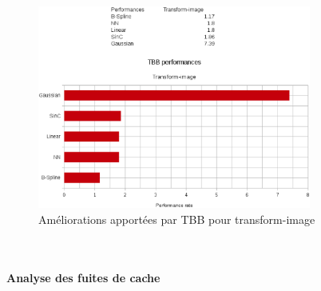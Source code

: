 \documentclass[10pt]{report}
\begin{document}
		\begin{figure}[h!]
			\begin{center}
				\includegraphics[width=9cm]{Reports/figures/performances_tbb_transform_image.eps}
			\end{center}	
			\caption{Améliorations apportées par TBB pour transform-image}
			\label{Améliorations apportées par TBB pour transform-image}
		\end{figure}~\par
%		
		\paragraph{Analyse des fuites de cache}
\end{document}
